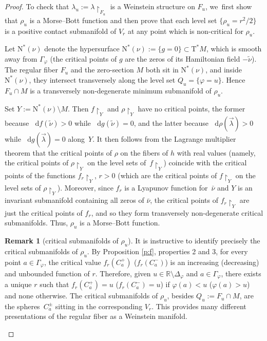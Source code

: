 \documentclass[JEP,XML,SOM,Unicode]{cedram}
\newcommand{\R}{{\mathbb R}}
\newcommand{\Crit}{\Gamma_{\!\varphi}}
\newcommand{\Discr}{\Delta_\varphi}
\newcommand{\sN}{\mathrm{N}^\ast}
\newcommand{\sT}{\mathrm{T}^\ast}
\renewcommand{\d}{\mathop{}\!\mathrm d}
\newcommand{\drho}{\d\rho}
\newcommand{\df}{\d f}
\newcommand{\dg}{\d g}
\newcommand{\hnu}{\tilde\nu}
\newcommand{\cnu}{\bar\nu}
\newcommand{\de}{\mathrel{:=}}
\newcommand{\rst}[1]{{\upharpoonright}_{\!#1}}
\theoremstyle{plain}
\theoremstyle{definition}
\newtheorem{remark}[theorem]{Remark}
\begin{document}
\begin{proof}
To check that $\lambda_u \de \lambda \rst{ F_u }$ is a Weinstein structure on
$F_u$, we~first show that $\rho_u$ is a Morse--Bott function and then prove that
each level set $\{\rho_u = r^2/2\}$ is a positive contact submanifold of $V_r$
at any point which is non-critical for $\rho_u$.

Let $\sN(\nu)$ denote the hypersurface $\sN(\nu) \de \{g=0\} \subset \sT M$,
which is smooth away from $\Crit$ (the critical points of $g$ are the zeros of
its Hamiltonian field $-\hnu$). The regular fiber $F_u$ and the zero-section $M$
both sit in $\sN(\nu)$, and inside $\sN(\nu)$, they intersect transversely along
the level set $Q_u = \{\varphi=u\}$. Hence $F_u \cap M$ is a transversely
non-degenerate minimum submanifold of $\rho_u$.

Set $Y \de \sN(\nu) \setminus M$. Then $f \rst Y$ and $\rho \rst Y$ have no critical
points, the former because $\df(\hnu) > 0$ while $\dg(\hnu) = 0$, and the latter
because $\drho(\vec\lambda) > 0$ while $\dg(\vec\lambda) = 0$ along~$Y$. It then
follows from the Lagrange multiplier theorem that the critical points of $\rho$
on the fibers of $h$ with real values (namely, the critical points of $\rho \rst
Y$ on the level sets of~$f \rst Y$) coincide with the critical points of the
functions $f_r \rst Y$, $r>0$ (which are the critical points of $f \rst Y$ on
the level sets of $\rho \rst Y$). Moreover, since $f_r$ is a Lyapunov function
for~$\cnu$ and $Y$ is an invariant submanifold containing all zeros of $\cnu$,
the critical points of $f_r \rst Y$ are just the critical points of $f_r$, and
so they form transversely non-degenerate critical submanifolds. Thus, $\rho_u$ is
a Morse--Bott function.

\begin{remark}[critical submanifolds of $\rho_u$]
It is instructive to identify precisely the critical submanifolds of $\rho_u$.
By Proposition \ref{p:f}, properties 2 and 3, for every point $a \in \Crit$,
the critical value $f_r(C_a^+)$ (\resp $f_r(C_a^-)$) is an increasing (\resp decreasing) and unbounded function of $r$. Therefore, given $u \in \R \setminus \Discr$
and $a \in \Crit$, there exists a unique $r$ such that $f_r(C_a^+) = u$ (\resp $f_r(C_a^-) = u$) if $\varphi(a) < u$ (\resp $\varphi(a) > u$) and none
otherwise. The critical submanifolds of $\rho_u$, besides $Q_u \de F_u \cap M$,
are the spheres~$C_a^\pm$ sitting in the corresponding $V_r$. This provides many
different presentations of the regular fiber as a Weinstein manifold.
\end{remark}


\end{proof}
\end{document}
